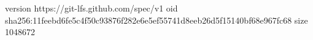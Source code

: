 version https://git-lfs.github.com/spec/v1
oid sha256:11feebd6fe5c4f50c93876f282e6e5ef55741d8eeb26d5f15140bf68e967fc68
size 1048672
